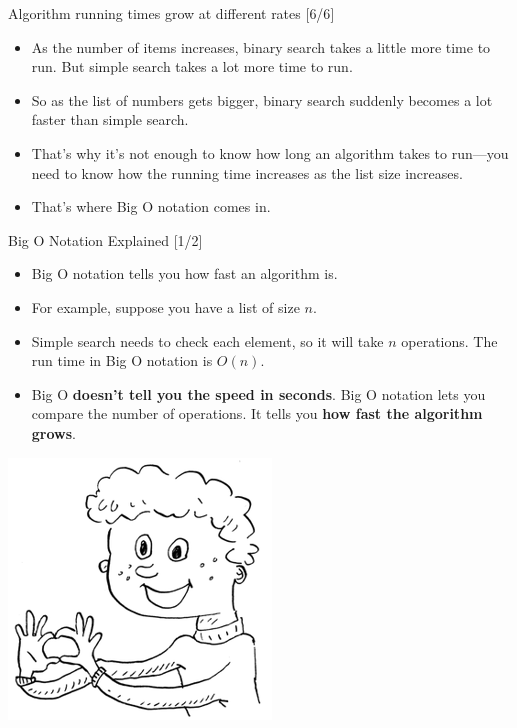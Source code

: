 \documentclass[ignorenonframetext,]{beamer}
\providecommand{\tightlist}{%
  \setlength{\itemsep}{0pt}\setlength{\parskip}{0pt}}
\begin{document}
\begin{frame}{Algorithm running times grow at different rates {[}6/6{]}}
\protect\hypertarget{algorithm-running-times-grow-at-different-rates-66}{}

\begin{itemize}
\item
  As the number of items increases, binary search takes a little more
  time to run. But simple search takes a lot more time to run.
\item
  So as the list of numbers gets bigger, binary search suddenly becomes
  a lot faster than simple search.
\item
  That's why it's not enough to know how long an algorithm takes to
  run---you need to know how the running time increases as the list size
  increases.
\item
  That's where Big O notation comes in.
\end{itemize}

\end{frame}

\begin{frame}{Big O Notation Explained {[}1/2{]}}
\protect\hypertarget{big-o-notation-explained-12}{}

\begin{itemize}
\tightlist
\item
  Big O notation tells you how fast an algorithm is.
\item
  For example, suppose you have a list of size \(n\).
\item
  Simple search needs to check each element, so it will take \(n\)
  operations. The run time in Big O notation is \(O(n)\).
\item
  Big O \textbf{doesn't tell you the speed in seconds}. Big O notation
  lets you compare the number of operations. It tells you \textbf{how
  fast the algorithm grows}.
\end{itemize}

\includegraphics{./Chapter01-figure/big_o_hand_gesture.png}

\end{frame}
\end{document}
